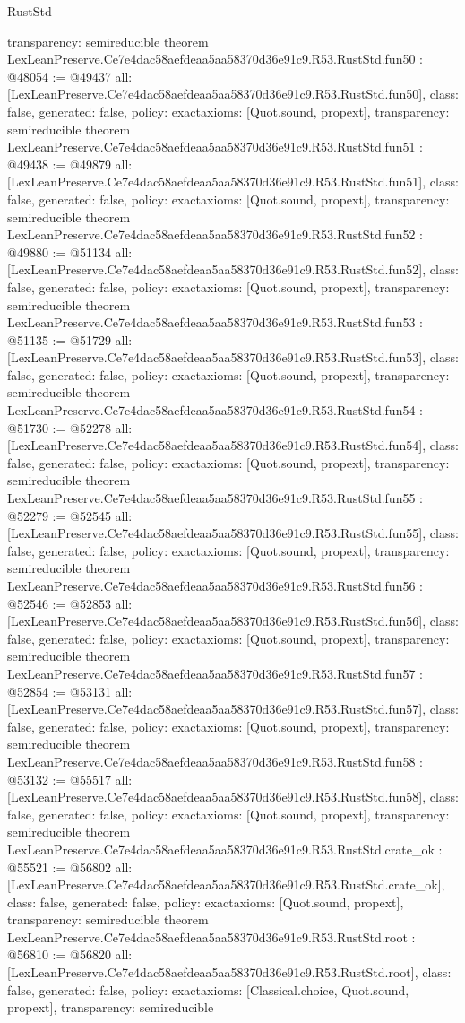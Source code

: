 \begin{lexlean}{RustStd}
\begin{coremodule}
{  transparency: semireducible
}
theorem LexLeanPreserve.Ce7e4dac58aefdeaa5aa58370d36e91c9.R53.RustStd.fun50 : @48054 := @49437 {
  all: [LexLeanPreserve.Ce7e4dac58aefdeaa5aa58370d36e91c9.R53.RustStd.fun50],
  class: false,
  generated: false,
  policy: exact{axioms: [Quot.sound, propext]},
  transparency: semireducible
}
theorem LexLeanPreserve.Ce7e4dac58aefdeaa5aa58370d36e91c9.R53.RustStd.fun51 : @49438 := @49879 {
  all: [LexLeanPreserve.Ce7e4dac58aefdeaa5aa58370d36e91c9.R53.RustStd.fun51],
  class: false,
  generated: false,
  policy: exact{axioms: [Quot.sound, propext]},
  transparency: semireducible
}
theorem LexLeanPreserve.Ce7e4dac58aefdeaa5aa58370d36e91c9.R53.RustStd.fun52 : @49880 := @51134 {
  all: [LexLeanPreserve.Ce7e4dac58aefdeaa5aa58370d36e91c9.R53.RustStd.fun52],
  class: false,
  generated: false,
  policy: exact{axioms: [Quot.sound, propext]},
  transparency: semireducible
}
theorem LexLeanPreserve.Ce7e4dac58aefdeaa5aa58370d36e91c9.R53.RustStd.fun53 : @51135 := @51729 {
  all: [LexLeanPreserve.Ce7e4dac58aefdeaa5aa58370d36e91c9.R53.RustStd.fun53],
  class: false,
  generated: false,
  policy: exact{axioms: [Quot.sound, propext]},
  transparency: semireducible
}
theorem LexLeanPreserve.Ce7e4dac58aefdeaa5aa58370d36e91c9.R53.RustStd.fun54 : @51730 := @52278 {
  all: [LexLeanPreserve.Ce7e4dac58aefdeaa5aa58370d36e91c9.R53.RustStd.fun54],
  class: false,
  generated: false,
  policy: exact{axioms: [Quot.sound, propext]},
  transparency: semireducible
}
theorem LexLeanPreserve.Ce7e4dac58aefdeaa5aa58370d36e91c9.R53.RustStd.fun55 : @52279 := @52545 {
  all: [LexLeanPreserve.Ce7e4dac58aefdeaa5aa58370d36e91c9.R53.RustStd.fun55],
  class: false,
  generated: false,
  policy: exact{axioms: [Quot.sound, propext]},
  transparency: semireducible
}
theorem LexLeanPreserve.Ce7e4dac58aefdeaa5aa58370d36e91c9.R53.RustStd.fun56 : @52546 := @52853 {
  all: [LexLeanPreserve.Ce7e4dac58aefdeaa5aa58370d36e91c9.R53.RustStd.fun56],
  class: false,
  generated: false,
  policy: exact{axioms: [Quot.sound, propext]},
  transparency: semireducible
}
theorem LexLeanPreserve.Ce7e4dac58aefdeaa5aa58370d36e91c9.R53.RustStd.fun57 : @52854 := @53131 {
  all: [LexLeanPreserve.Ce7e4dac58aefdeaa5aa58370d36e91c9.R53.RustStd.fun57],
  class: false,
  generated: false,
  policy: exact{axioms: [Quot.sound, propext]},
  transparency: semireducible
}
theorem LexLeanPreserve.Ce7e4dac58aefdeaa5aa58370d36e91c9.R53.RustStd.fun58 : @53132 := @55517 {
  all: [LexLeanPreserve.Ce7e4dac58aefdeaa5aa58370d36e91c9.R53.RustStd.fun58],
  class: false,
  generated: false,
  policy: exact{axioms: [Quot.sound, propext]},
  transparency: semireducible
}
theorem LexLeanPreserve.Ce7e4dac58aefdeaa5aa58370d36e91c9.R53.RustStd.crate_ok : @55521 := @56802 {
  all: [LexLeanPreserve.Ce7e4dac58aefdeaa5aa58370d36e91c9.R53.RustStd.crate_ok],
  class: false,
  generated: false,
  policy: exact{axioms: [Quot.sound, propext]},
  transparency: semireducible
}
theorem LexLeanPreserve.Ce7e4dac58aefdeaa5aa58370d36e91c9.R53.RustStd.root : @56810 := @56820 {
  all: [LexLeanPreserve.Ce7e4dac58aefdeaa5aa58370d36e91c9.R53.RustStd.root],
  class: false,
  generated: false,
  policy: exact{axioms: [Classical.choice, Quot.sound, propext]},
  transparency: semireducible
}


\end{coremodule}
\end{lexlean}
